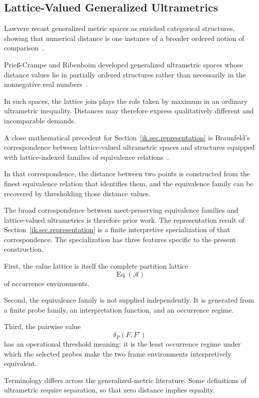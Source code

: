 \documentclass[11pt]{article}
\theoremstyle{plain}
\theoremstyle{definition}
\theoremstyle{remark}
\begin{document}
\subsection{Lattice-Valued Generalized Ultrametrics}

Lawvere recast generalized metric spaces
as enriched categorical structures,
showing that numerical distance
is one instance of a broader ordered notion
of comparison~\citep{lawvere1973metric}.

Prie{\ss}-Crampe and Ribenboim
developed generalized ultrametric spaces
whose distance values lie in partially ordered structures
rather than necessarily
in the nonnegative real numbers~\citep{priesscrampe1996generalized}.

In such spaces, the lattice join plays the role
taken by maximum in an ordinary ultrametric inequality.
Distances may therefore express qualitatively different and incomparable demands.

A close mathematical precedent
for Section~\ref{ik.sec.representation}
is Braunfeld's correspondence
between lattice-valued ultrametric spaces
and structures equipped with lattice-indexed families
of equivalence relations~\citep{braunfeld2019lambda}.

In that correspondence, the distance between two points
is constructed from the finest equivalence relation
that identifies them, and the equivalence family
can be recovered by thresholding those distance values.

The broad correspondence between meet-preserving equivalence families
and lattice-valued ultrametrics is therefore prior work.
The representation result of Section~\ref{ik.sec.representation}
is a finite interpretive specialization
of that correspondence.
The specialization has three features specific to the present construction.

First,
the value lattice is itself
the complete partition lattice
\[
  \operatorname{Eq}(\mathcal{A})
\]
of occurrence environments.

Second,
the equivalence family
is not supplied independently.
It is generated from
a finite probe family,
an interpretation function,
and an occurrence regime.

Third,
the pairwise value
\[
  \delta_P(F,F')
\]
has an operational threshold meaning:
it is the least occurrence regime
under which the selected probes
make the two frame environments
interpretively equivalent.

Terminology differs across
the generalized-metric literature.
Some definitions of ultrametric
require separation,
so that zero distance implies equality.
\end{document}
